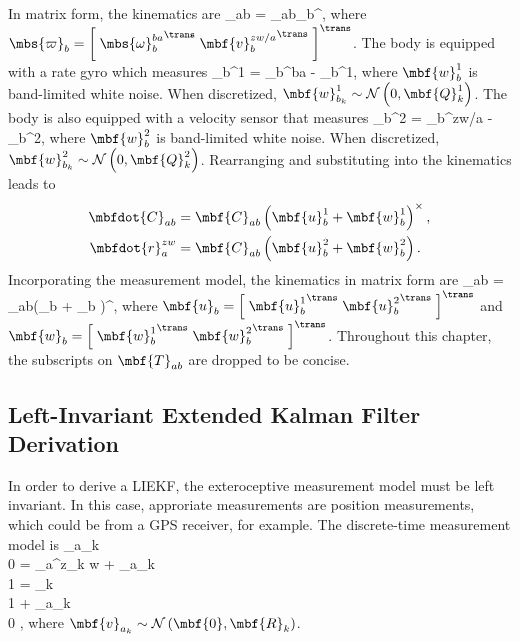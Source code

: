 In matrix form, the kinematics are 
\bdis
	_{ab} = _{ab}\mbs{\varpi}_b^\wedge,
\edis
where $\mbs{\varpi}_b = \left[ \; {\mbs{\omega}_b^{ba}}^\trans \; {\mbf{v}_b^{zw/a}}^\trans \; \right]^\trans$. 
The body is equipped with a rate gyro which measures
\bdis
	_b^1 = \mbs{\omega}_b^{ba} - _b^1,
\edis
where $\mbf{w}_{b}^1$ is band-limited white noise. When discretized, $\mbf{w}_{b_k}^1 \sim \mathcal{N}\left(0,\mbf{Q}_k^1\right)$.  The body is also equipped with a velocity sensor that measures
\bdis
	_b^2 = _{b}^{zw/a} - _b^2,
\edis
where $\mbf{w}_{b}^2$ is band-limited white noise. When discretized, $\mbf{w}_{b_k}^2 \sim \mathcal{N}\left(0,\mbf{Q}_k^2\right)$. Rearranging and substituting into the kinematics leads to
\begin{align*}
	\mbfdot{C}_{ab} &= \mbf{C}_{ab} \left(\mbf{u}_b^1 + \mbf{w}_b^1\right)^\times, \\
	\mbfdot{r}_a^{zw} &= \mbf{C}_{ab} \left(\mbf{u}_b^2 +  \mbf{w}_b^2 \right).
\end{align*}
Incorporating the measurement model, the kinematics in matrix form are 
\bdis
	_{ab} = _{ab}\left(_b +  _b \right)^\wedge,
\edis
where $\mbf{u}_b = \left[ \; {\mbf{u}_b^1}^\trans \; {\mbf{u}_b^2}^\trans \; \right]^\trans$ and $\mbf{w}_b = \left[ \; {\mbf{w}_b^1}^\trans \; {\mbf{w}_b^2}^\trans \; \right]^\trans$. Throughout this chapter, the subscripts on $\mbf{T}_{ab}$ are dropped to be concise.


\subsection{Left-Invariant Extended Kalman Filter Derivation}
\label{ssec:se3_LIEKF}

In order to derive a LIEKF, the exteroceptive measurement model must be left invariant. In this case, approriate measurements are position measurements, which could be from a GPS receiver, for example. The discrete-time measurement model is
\beq
	 _{a_k} \\ 0 \ema =  _a^{z_k w} +  _{a_k} \\ 1 \ema = _k
		 \\
		1
	\ema
	+ 
		_{a_k} \\
		0
	\ema, \label{eq:se3_meas_left}
\eeq
where $\mbf{v}_{a_k} \sim \mathcal{N}\left(\mbf{0},\mbf{R}_k\right)$. 

